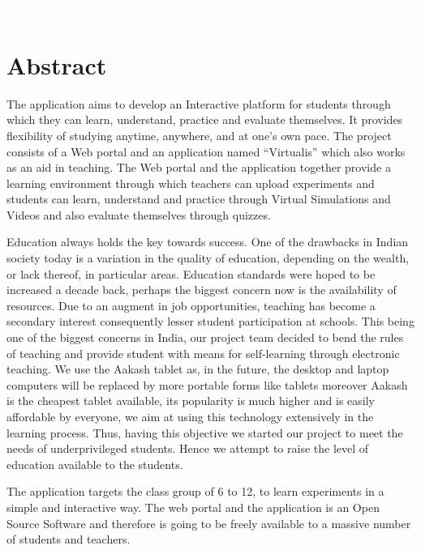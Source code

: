 \documentclass[12pt]{report}
\begin{document}
 \pagebreak \thispagestyle{empty} \textcolor{white}{text} \pagebreak



\chapter*{Abstract}
\setcounter{page}{1}
The application aims to develop an Interactive platform for students through which they can learn, understand, practice and evaluate themselves. It provides flexibility of studying anytime, anywhere, and at one's own pace. The project consists of a Web portal and an application named “Virtualis” which also works as an aid in teaching. The Web portal and the application together provide a learning environment through which teachers can upload experiments and students can learn, understand and practice through Virtual Simulations and Videos and also evaluate themselves through quizzes.\newline

Education always holds the key towards success. One of the drawbacks in Indian society today is a variation in the quality of education, depending on the wealth, or lack thereof, in particular areas. Education standards were hoped to be increased a decade back, perhaps the biggest concern now is the availability of resources. Due to an augment in job opportunities, teaching has become a secondary interest consequently lesser student participation at schools. This being one of the biggest concerns in India, our project team decided to bend the rules of teaching and provide student with means for self-learning through electronic teaching. We use the Aakash tablet as, in the future, the desktop and laptop computers will be replaced by more portable forms like tablets moreover Aakash is the cheapest tablet available, its popularity is much higher and is easily affordable by everyone, we aim at using this technology extensively in the learning process. Thus, having this objective we started our project to meet the needs of underprivileged students. Hence we attempt to raise the level of education available to the students.\newline

The application targets the class group of 6 to 12, to learn experiments in a simple and interactive way. The web portal and the application is an Open Source Software and therefore is going to be freely available to a massive number of students and teachers.

\pagebreak \thispagestyle{empty} \pagebreak
\listoffigures
\listoftables
\tableofcontents
\end{document}
